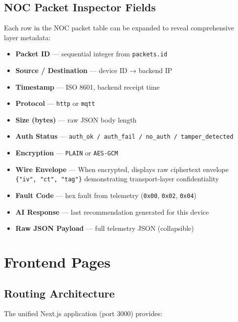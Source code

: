\documentclass[12pt,a4paper]{report}
\begin{document}
\section{NOC Packet Inspector Fields}

Each row in the NOC packet table can be expanded to reveal comprehensive layer metadata:

\begin{itemize}
  \item \textbf{Packet ID} — sequential integer from \texttt{packets.id}
  \item \textbf{Source / Destination} — device ID → backend IP
  \item \textbf{Timestamp} — ISO 8601, backend receipt time
  \item \textbf{Protocol} — \texttt{http} or \texttt{mqtt}
  \item \textbf{Size (bytes)} — raw JSON body length
  \item \textbf{Auth Status} — \texttt{auth\_ok / auth\_fail / no\_auth / tamper\_detected}
  \item \textbf{Encryption} — \texttt{PLAIN} or \texttt{AES-GCM}
  \item \textbf{Wire Envelope} — When encrypted, displays raw ciphertext envelope \texttt{\{"iv", "ct", "tag"\}} demonstrating transport-layer confidentiality
  \item \textbf{Fault Code} — hex fault from telemetry (\texttt{0x00}, \texttt{0x02}, \texttt{0x04})
  \item \textbf{AI Response} — last recommendation generated for this device
  \item \textbf{Raw JSON Payload} — full telemetry JSON (collapsible)
\end{itemize}

\chapter{Frontend Pages}

\section{Routing Architecture}

The unified Next.js application (port 3000) provides:
\end{document}

